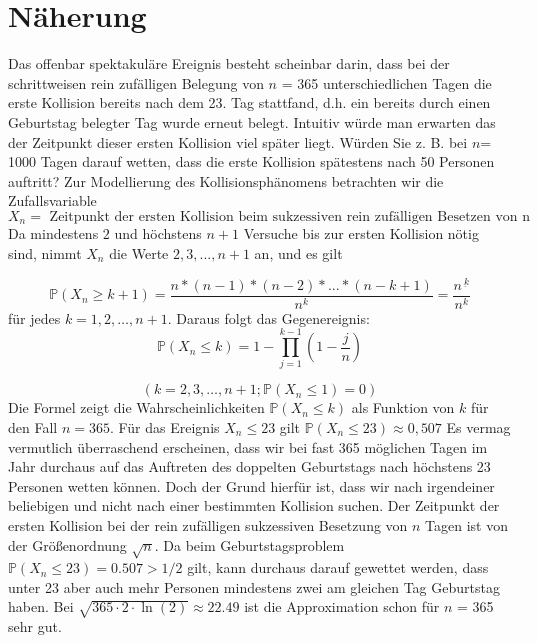 \documentclass[11pt]{article}
\begin{document}
    \section{Näherung}

    Das offenbar spektakuläre Ereignis besteht scheinbar darin, dass bei der schrittweisen rein zufälligen Belegung
    von \(n\) = 365 unterschiedlichen Tagen die erste Kollision bereits nach dem 23. Tag stattfand, d.h. ein bereits
    durch einen Geburtstag belegter Tag wurde erneut belegt.
    Intuitiv würde man erwarten das der Zeitpunkt dieser
    ersten Kollision viel später liegt.
    Würden Sie z. B. bei \(n\)= 1000 Tagen darauf wetten, dass die erste Kollision
    spätestens nach 50 Personen auftritt?
    \newline
    Zur Modellierung des Kollisionsphänomens betrachten wir die Zufallsvariable
    \newline
    \[{ X_{n} = \text{ Zeitpunkt der ersten Kollision beim sukzessiven rein zufälligen Besetzen von n Tagen. } }\]
    \newline
    Da mindestens \(2\) und höchstens \(n + 1\) Versuche bis zur ersten Kollision nötig sind, nimmt \(X_n\) die
    Werte \(2,3, . . ., n + 1\) an, und es gilt


    \[\mathbb{P}(X_{n} \geq k+1) = \frac {n*(n-1)*(n-2)* ... * (n-k + 1)}{n^k} = \frac{n^{\underline{\ k}}}{n^k}\]
    \newline\newline
    für jedes \(k = 1,2,\dots,n+1\).
    \newline
    Daraus folgt das Gegenereignis:
    \newline\newline
    \[\mathbb{P}(X_{n} \leq k) = 1-\prod \limits_{j=1}^{k-1}(1- \frac{j}{n})\]

    \[(k=2,3,\dots,n+1; \mathbb{P}(X_n\leq1) = 0)\]
    \newline
    Die Formel zeigt die Wahrscheinlichkeiten \(\mathbb{P}(X_{n} \leq k)\) als Funktion von \(k\) für den Fall \(n = 365\).
    Für das Ereignis \({X_{n} \leq 23}\) gilt \( \mathbb{P}(X_{n} \leq 23) \approx 0,507 \)
    \newline
    \newline
    Es vermag vermutlich überraschend erscheinen, dass wir bei fast 365 möglichen Tagen im Jahr durchaus auf das
    Auftreten des doppelten Geburtstags nach höchstens 23 Personen wetten können. Doch der Grund hierfür ist, dass wir
    nach irgendeiner beliebigen und nicht nach einer bestimmten Kollision suchen.
    Der Zeitpunkt der ersten Kollision bei der rein zufälligen sukzessiven Besetzung von \(n\) Tagen ist von
    der Größenordnung \(\sqrt{n}\).
    \newline
    \newline
    Da beim Geburtstagsproblem  \(\mathbb{P} (X_n \leq 23) = 0.507 > 1/2\) gilt, kann durchaus darauf gewettet werden,
    dass unter 23 aber auch mehr Personen mindestens zwei am gleichen Tag Geburtstag haben. Bei
    \(\sqrt{365 \cdot 2 \cdot \ln(2)} \approx 22.49\)
    ist die Approximation schon für \(n\) = 365 sehr gut.
\end{document}
